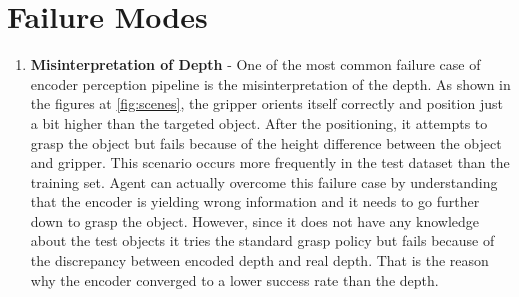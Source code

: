 \section{Failure Modes \label{sec:fail}}


\begin{enumerate}
    \item \textbf{Misinterpretation of Depth} - One of the most common failure case of encoder perception pipeline is the misinterpretation of the depth. As shown in the figures at 
    \ref{fig:scenes}, the gripper orients itself correctly and position just a bit higher than the targeted object. After the positioning, it attempts to grasp the object but fails because of the height difference between the object and gripper. This scenario occurs more frequently in the test dataset than the training set. Agent can actually overcome this failure case by understanding that the encoder is yielding wrong information and it needs to go further down to grasp the object. However, since it does not have any knowledge about the test objects it tries the standard grasp policy but fails because of the discrepancy between encoded depth and real depth. That is the reason why the encoder converged to a lower success rate than the depth.
        \begin{figure}[!htbp]
            \begin{subfigure}{0.49\textwidth}

\end{subfigure}
\end{figure}
\end{enumerate}
